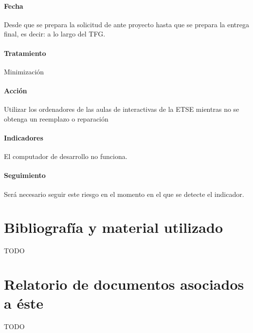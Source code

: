 \documentclass[10pt,a4paper]{article}
\begin{document}
				\paragraph{Fecha} Desde que se prepara la solicitud de ante proyecto hasta que se prepara la entrega final, es decir: a lo largo del TFG.  %
				\paragraph{Tratamiento} Minimización %
				\paragraph{Acción} Utilizar los ordenadores de las aulas de interactivas de la ETSE mientras no se obtenga un reemplazo o reparación%
				\paragraph{Indicadores} El computador de desarrollo no funciona.%
				\paragraph{Seguimiento}	Será necesario seguir este riesgo en el momento en el que se detecte el indicador. %

				
	\appendix
		\section{Bibliografía y material utilizado}
			TODO %
			
		\section{Relatorio de documentos asociados a éste}
			TODO %
\end{document}
